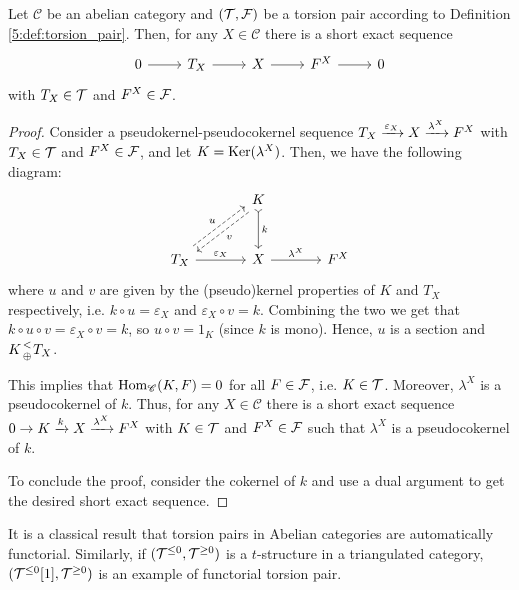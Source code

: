 \begin{lemma}
  Let $\mathscr{C}$ be an abelian category and $(\mathcal{T},\mathcal{F})$ be a torsion pair according to Definition \ref{5:def:torsion_pair}. Then, for any $X\in\mathscr{C}$ there is a short exact sequence
  \begin{equation*}
    \begin{tikzcd}
      0\arrow{r}&T_X\arrow{r}&X\arrow{r}&F^X\arrow{r}&0
    \end{tikzcd}
  \end{equation*}
  with $T_X\in\mathcal{T}$ and $F^X\in\mathcal{F}$.
\end{lemma}

\begin{proof}
  Consider a pseudokernel-pseudocokernel sequence $T_X\xrightarrow{\varepsilon_X} X\xrightarrow{\lambda^X} F^X$ with $T_X\in \mathcal{T}$ and $F^X\in\mathcal{F}$, and let $K=\operatorname{Ker}(\lambda^X)$. Then, we have the following diagram:
  \begin{equation*}
    \begin{tikzcd}[column sep=large,row sep=large]
      & K\arrow[tail]{d}{k}\arrow[dashed,shift left]{dl}{v}
        &\\
      T_X\arrow{r}{\varepsilon_X}\arrow[dashed,shift left]{ur}{u}
      & X\arrow{r}{\lambda^X}
        & F^X
    \end{tikzcd}
  \end{equation*}
  where $u$ and $v$ are given by the (pseudo)kernel properties of $K$ and $T_X$ respectively, i.e. $k\circ u=\varepsilon_X$ and $\varepsilon_X\circ v = k$. Combining the two we get that $k\circ u\circ v = \varepsilon_X\circ v = k$, so $u\circ v=1_K$ (since $k$ is mono). Hence, $u$ is a section and $K {< \atop \oplus} T_X$.

  This implies that $\operatorname{Hom}_\mathscr{C}(K,F)=0$ for all $F\in\mathcal{F}$, i.e. $K\in\mathcal{T}$. Moreover, $\lambda^X$ is a pseudocokernel of $k$. Thus, for any $X\in\mathscr{C}$ there is a short exact sequence $0\to K\xrightarrow{k} X\xrightarrow{\lambda^X} F^X$ with $K\in\mathcal{T}$ and $F^X\in\mathcal{F}$ such that $\lambda^X$ is a pseudocokernel of $k$.

  To conclude the proof, consider the cokernel of $k$ and use a dual argument to get the desired short exact sequence.
\end{proof}


\begin{sloppypar}
It is a classical result that torsion pairs in Abelian categories are automatically functorial. Similarly, if $(\mathcal{T}^{\leq 0},\mathcal{T}^{\geq 0})$ is a $t$-structure in a triangulated category, $(\mathcal{T}^{\leq 0}[1],\mathcal{T}^{\geq 0})$ is an example of functorial torsion pair.
\end{sloppypar}

